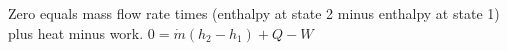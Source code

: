 Zero equals mass flow rate times (enthalpy at state 2 minus enthalpy at state 1) plus heat minus work.  
\( 0 = \dot{m} (h_2 - h_1) + Q - W \)